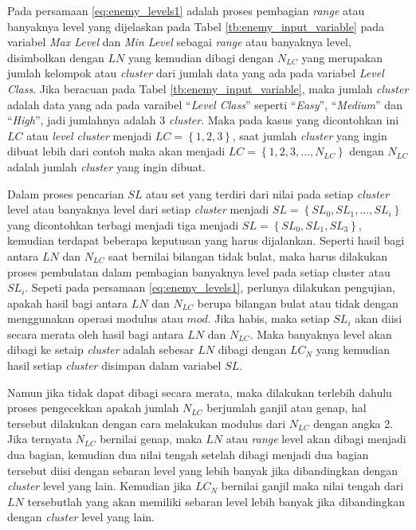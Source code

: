 Pada persamaan \ref{eq:enemy_levels1} adalah proses pembagian \textit{range} atau banyaknya level yang dijelaskan pada Tabel \ref{tb:enemy_input_variable} pada variabel \textit{Max Level} dan \textit{Min Level} sebagai \textit{range} atau banyaknya level, disimbolkan dengan $LN$ yang kemudian dibagi dengan $N_{LC}$ yang merupakan jumlah kelompok atau \textit{cluster} dari jumlah data yang ada pada variabel \textit{Level Class}. Jika beracuan pada Tabel \ref{tb:enemy_input_variable}, maka jumlah \textit{cluster} adalah data yang ada pada varaibel ``\textit{Level Class}'' seperti ``\textit{Easy}'', ``\textit{Medium}'' dan ``\textit{High}'', jadi jumlahnya adalah 3 \textit{cluster}. Maka pada kasus yang dicontohkan ini $LC$ atau \textit{level cluster} menjadi $LC = \left \{1, 2, 3 \right \}$, saat jumlah \textit{cluster} yang ingin dibuat lebih dari contoh maka akan menjadi $LC = \left \{1, 2, 3,..., N_{LC} \right \}$ dengan $N_{LC}$ adalah jumlah \textit{cluster} yang ingin dibuat.
\vspace{1ex}

Dalam proses pencarian $SL$ atau set yang terdiri dari nilai pada setiap \textit{cluster} level atau banyaknya level dari setiap \textit{cluster} menjadi $SL = \left \{SL_{0}, SL_{1},... , SL_{i} \right\}$ yang dicontohkan terbagi menjadi tiga menjadi $SL = \left \{SL_{0}, SL_{1}, SL_{3} \right \}$, kemudian terdapat beberapa keputusan yang harus dijalankan. Seperti hasil bagi antara $LN$ dan $N_{LC}$ saat bernilai bilangan tidak bulat, maka harus dilakukan proses pembulatan dalam pembagian banyaknya level pada setiap cluster atau $SL_{i}$. Sepeti pada persamaan \ref{eq:enemy_levels1}, perlunya dilakukan pengujian, apakah hasil bagi antara $LN$ dan $N_{LC}$ berupa bilangan bulat atau tidak dengan menggunakan operasi modulus atau $mod$. Jika habis, maka setiap $SL_{i}$ akan diisi secara merata oleh hasil bagi antara $LN$ dan $N_{LC}$. Maka banyaknya level akan dibagi ke setaip \textit{cluster} adalah sebesar $LN$ dibagi dengan $LC_{N}$ yang kemudian hasil setiap \textit{cluster} disimpan dalam variabel $SL$.
\vspace{1ex}

Namun jika tidak dapat dibagi secara merata, maka dilakukan terlebih dahulu proses pengecekkan apakah jumlah $N_{LC}$ berjumlah ganjil atau genap, hal tersebut dilakukan dengan cara melakukan modulus dari $N_{LC}$ dengan angka 2. Jika ternyata $N_{LC}$ bernilai genap, maka $LN$ atau \textit{range} level akan dibagi menjadi dua bagian, kemudian dua nilai tengah setelah dibagi menjadi dua bagian tersebut diisi dengan sebaran level yang lebih banyak jika dibandingkan dengan \textit{cluster} level yang lain. Kemudian jika $LC_{N}$ bernilai ganjil maka nilai tengah dari $LN$ tersebutlah yang akan memiliki sebaran level lebih banyak jika dibandingkan dengan \textit{cluster} level yang lain.
\vspace{1ex}

